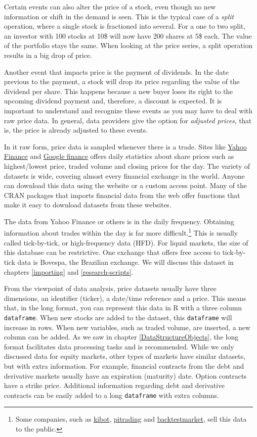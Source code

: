 \documentclass[11pt,]{book}
\let\rmarkdownfootnote\footnote%
\def\footnote{\protect\rmarkdownfootnote}
\begin{document}
Certain events can also alter the price of a stock, even though no new
information or shift in the demand is seen. This is the typical case of
a \emph{split} operation, where a single stock is fractioned into
several. For a one to two split, an investor with 100 stocks at 10\$
will now have 200 shares at 5\$ each. The value of the portfolio stays
the same. When looking at the price series, a split operation results in
a big drop of price.

Another event that impacts price is the payment of dividends. In the
date previous to the payment, a stock will drop its price regarding the
value of the dividend per share. This happens because a new buyer loses
its right to the upcoming dividend payment and, therefore, a discount is
expected. It is important to understand and recognize these events as
you may have to deal with raw price data. In general, data providers
give the option for \emph{adjusted prices}, that is, the price is
already adjusted to these events.

In it raw form, price data is sampled whenever there is a trade. Sites
like \href{https://finance.yahoo.com/}{Yahoo Finance} and
\href{https://www.google.com/finance}{Google finance} offers daily
statistics about share prices such as highest/lowest price, traded
volume and closing prices for the day. The variety of datasets is wide,
covering almost every financial exchange in the world. Anyone can
download this data using the website or a custom access point. Many of
the CRAN packages that imports financial data from the web offer
functions that make it easy to download datasets from these websites.

The data from Yahoo Finance or others is in the daily frequency.
Obtaining information about trades within the day is far more
difficult.\footnote{Some companies, such as
  \href{http://www.kibot.com}{kibot},
  \href{http://www.pitrading.com/}{pitrading} and
  \href{https://www.backtestmarket.com/}{backtestmarket}, sell this data
  to the public.} This is usually called tick-by-tick, or high-frequency
data (HFD). For liquid markets, the size of this database can be
restrictive. One exchange that offers free access to tick-by-tick data
is Bovespa, the Brazilian exchange. We will discuss this dataset in
chapters \ref{importing} and \ref{research-scripts}.

From the viewpoint of data analysis, price datasets usually have three
dimensions, an identifier (ticker), a date/time reference and a price.
This means that, in the long format, you can represent this data in R
with a three column \texttt{dataframe}. When new stocks are added to the
dataset, this \texttt{dataframe} will increase in rows. When new
variables, such as traded volume, are inserted, a new column can be
added. As we saw in chapter \ref{DataStructureObjects}, the long format
facilitates data processing tasks and is recommended. While we only
discussed data for equity markets, other types of markets have similar
datasets, but with extra information. For example, financial contracts
from the debt and derivative markets usually have an expiration
(maturity) date. Option contracts have a strike price. Additional
information regarding debt and derivative contracts can be easily added
to a long \texttt{dataframe} with extra columns.
\end{document}
